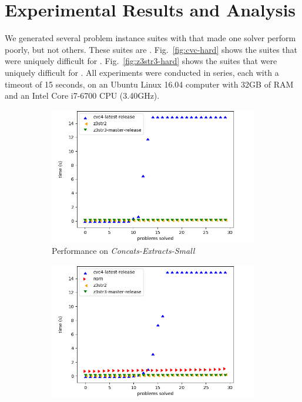 \section{Experimental Results and Analysis}
\label{sec:data}

We generated several problem instance suites with \fuzzer{} that made one
solver perform poorly, but not others. These suites are
\theSuites{}. Fig.~\ref{fig:cvc-hard} shows the suites that were
uniquely difficult for \cvc{}. Fig.~\ref{fig:z3str3-hard} shows the
suites that were uniquely difficult for \us{}. All experiments were
conducted in series, each with a timeout of 15 seconds,
on an Ubuntu Linux 16.04 computer with 32GB of RAM and an
Intel\textregistered{} Core\texttrademark{} i7-6700 CPU (3.40GHz).

\begin{figure}[h]
    \begin{subfigure}{.5\textwidth}
        \includegraphics[width=\textwidth]{data/graphs/concats-extracts-small.png}
        \caption{Performance on \textit{Concats-Extracts-Small}}
        \label{fig:concats-extracts-small}
    \end{subfigure}
    \begin{subfigure}{.5\textwidth}
        \includegraphics[width=\textwidth]{data/graphs/different-prefix.png}

\end{subfigure}
\end{figure}
